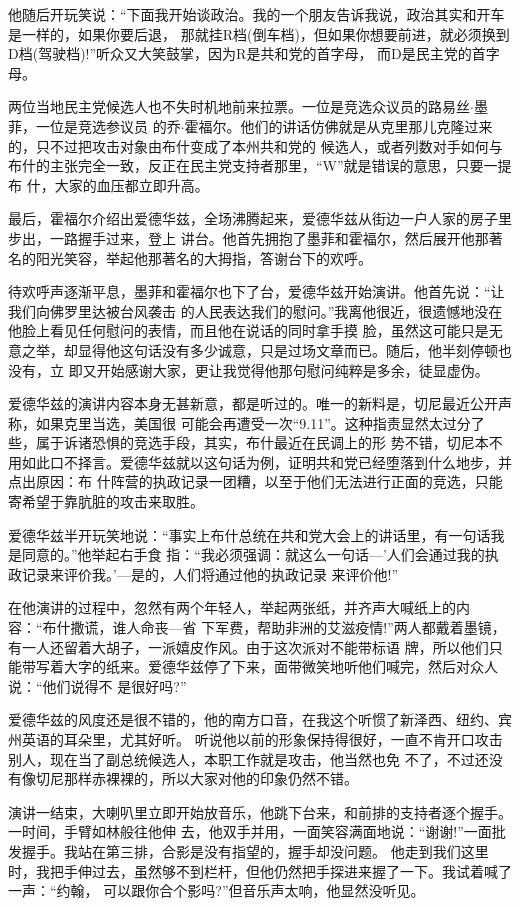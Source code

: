 ﻿\documentclass[11pt]{article}
\begin{document}
他随后开玩笑说：``下面我开始谈政治。我的一个朋友告诉我说，政治其实和开车是一样的，如果你要后退，
那就挂R档(倒车档)，但如果你想要前进，就必须换到D档(驾驶档)!''听众又大笑鼓掌，因为R是共和党的首字母，
而D是民主党的首字母。

两位当地民主党候选人也不失时机地前来拉票。一位是竞选众议员的路易丝$\cdot$墨菲，一位是竞选参议员
的乔$\cdot$霍福尔。他们的讲话仿佛就是从克里那儿克隆过来的，只不过把攻击对象由布什变成了本州共和党的
候选人，或者列数对手如何与布什的主张完全一致，反正在民主党支持者那里，``W''就是错误的意思，只要一提布
什，大家的血压都立即升高。

最后，霍福尔介绍出爱德华兹，全场沸腾起来，爱德华兹从街边一户人家的房子里步出，一路握手过来，登上
讲台。他首先拥抱了墨菲和霍福尔，然后展开他那著名的阳光笑容，举起他那著名的大拇指，答谢台下的欢呼。

待欢呼声逐渐平息，墨菲和霍福尔也下了台，爱德华兹开始演讲。他首先说：``让我们向佛罗里达被台风袭击
的人民表达我们的慰问。''我离他很近，很遗憾地没在他脸上看见任何慰问的表情，而且他在说话的同时拿手摸
脸，虽然这可能只是无意之举，却显得他这句话没有多少诚意，只是过场文章而已。随后，他半刻停顿也没有，立
即又开始感谢大家，更让我觉得他那句慰问纯粹是多余，徒显虚伪。


爱德华兹的演讲内容本身无甚新意，都是听过的。唯一的新料是，切尼最近公开声称，如果克里当选，美国很
可能会再遭受一次``9.11''。这种指责显然太过分了些，属于诉诸恐惧的竞选手段，其实，布什最近在民调上的形
势不错，切尼本不用如此口不择言。爱德华兹就以这句话为例，证明共和党已经堕落到什么地步，并点出原因：布
什阵营的执政记录一团糟，以至于他们无法进行正面的竞选，只能寄希望于靠肮脏的攻击来取胜。

爱德华兹半开玩笑地说：``事实上布什总统在共和党大会上的讲话里，有一句话我是同意的。''他举起右手食
指：``我必须强调：就这么一句话---'人们会通过我的执政记录来评价我。'---是的，人们将通过他的执政记录
来评价他!''

在他演讲的过程中，忽然有两个年轻人，举起两张纸，并齐声大喊纸上的内容：``布什撒谎，谁人命丧---省
下军费，帮助非洲的艾滋疫情!''两人都戴着墨镜，有一人还留着大胡子，一派嬉皮作风。由于这次派对不能带标语
牌，所以他们只能带写着大字的纸来。爱德华兹停了下来，面带微笑地听他们喊完，然后对众人说：``他们说得不
是很好吗?''

爱德华兹的风度还是很不错的，他的南方口音，在我这个听惯了新泽西、纽约、宾州英语的耳朵里，尤其好听。
听说他以前的形象保持得很好，一直不肯开口攻击别人，现在当了副总统候选人，本职工作就是攻击，他当然也免
不了，不过还没有像切尼那样赤裸裸的，所以大家对他的印象仍然不错。

演讲一结束，大喇叭里立即开始放音乐，他跳下台来，和前排的支持者逐个握手。一时间，手臂如林般往他伸
去，他双手并用，一面笑容满面地说：``谢谢!''一面批发握手。我站在第三排，合影是没有指望的，握手却没问题。
他走到我们这里时，我把手伸过去，虽然够不到栏杆，但他仍然把手探进来握了一下。我试着喊了一声：``约翰，
可以跟你合个影吗?''但音乐声太响，他显然没听见。
\end{document}
